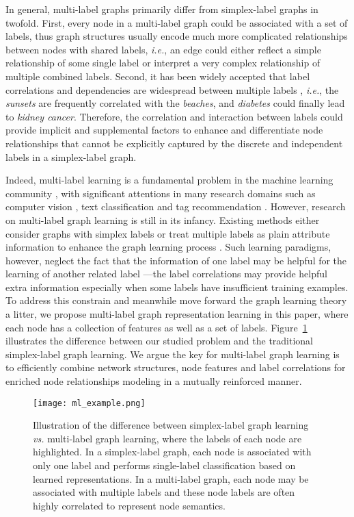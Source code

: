 \documentclass[conference]{IEEEtran}
\begin{document}
In general, multi-label graphs primarily differ from simplex-label graphs in twofold. First, every node in a multi-label graph could be associated with a set of labels, thus graph structures usually encode much more complicated relationships between nodes with shared labels, \textit{i.e.}, an edge could either reflect a simple relationship of some single label or interpret a very complex relationship of multiple combined labels. Second, it has been widely accepted that label correlations and dependencies are widespread between multiple labels \cite{6,7}, \textit{i.e.}, the \textit{sunsets} are frequently correlated with the \textit{beaches}, and \textit{diabetes} could finally lead to \textit{kidney cancer}. Therefore, the correlation and interaction between labels could provide implicit and supplemental factors to enhance and differentiate node relationships that cannot be explicitly captured by the discrete and independent labels in a simplex-label graph.

Indeed, multi-label learning is a fundamental problem in the machine learning community \cite{8}, with significant attentions in many research domains such as computer vision \cite{9}, text classification \cite{10} and tag recommendation \cite{17}. However, research on multi-label graph learning is still in its infancy. Existing methods either consider graphs with simplex labels \cite{5,11} or treat multiple labels as plain attribute information to enhance the graph learning process \cite{12,13}. Such learning paradigms, however, neglect the fact that the information of one label may be helpful for the learning of another related label \cite{6}---the label correlations may provide helpful extra information especially when some labels have insufficient training examples. To address this constrain and meanwhile move forward the graph learning theory a litter, we propose multi-label graph representation learning in this paper, where each node has a collection of features as well as a set of labels. Figure~\ref{fig:motivation} illustrates the difference between our studied problem and the traditional simplex-label graph learning. We argue the key for multi-label graph learning is to efficiently combine network structures, node features and label correlations for enriched node relationships modeling in a mutually reinforced manner.


\begin{figure}
  \centering
    \texttt{[image: ml\_example.png]}
  \caption{Illustration of the difference between simplex-label graph learning \textit{vs.} multi-label graph learning, where the labels of each node are highlighted. In a simplex-label graph, each node is associated with only one label and performs single-label classification based on learned representations. In a multi-label graph, each node may be associated with multiple labels and these node labels are often highly correlated to represent node semantics.}\label{fig:motivation}
\end{figure}
\end{document}
